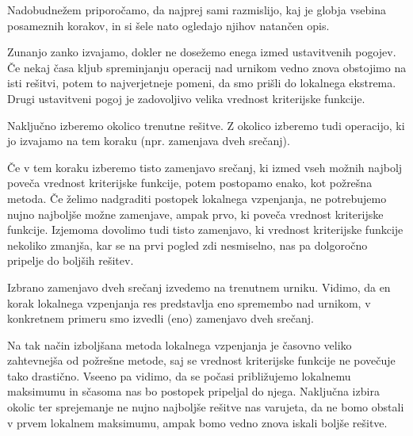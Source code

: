 \documentclass[a4paper,10pt]{article}
\begin{document}
   Nadobudnežem priporočamo, da najprej sami razmislijo, kaj je globja vsebina posameznih
   korakov, in si šele nato ogledajo njihov natančen opis.
   
      Zunanjo zanko izvajamo, dokler ne dosežemo enega izmed ustavitvenih pogojev.
      Če nekaj časa kljub spreminjanju operacij nad urnikom vedno znova obstojimo na isti
      rešitvi, potem to najverjetneje pomeni, da smo prišli do lokalnega ekstrema. Drugi
      ustavitveni pogoj je zadovoljivo velika vrednost kriterijske funkcije.
   
      Naključno izberemo okolico trenutne rešitve. Z okolico izberemo tudi operacijo,
      ki jo izvajamo na tem koraku (npr. zamenjava dveh srečanj).
   
      Če v tem koraku izberemo tisto zamenjavo srečanj, ki izmed vseh možnih najbolj
      poveča vrednost kriterijske funkcije, potem postopamo enako, kot požrešna metoda. Če
      želimo nadgraditi postopek lokalnega vzpenjanja, ne potrebujemo nujno najboljše možne
      zamenjave, ampak prvo, ki poveča vrednost kriterijske funkcije. Izjemoma dovolimo tudi
      tisto zamenjavo, ki vrednost kriterijske funkcije nekoliko zmanjša, kar se na prvi
      pogled zdi nesmiselno, nas pa dolgoročno pripelje do boljših rešitev.
   
      Izbrano zamenjavo dveh srečanj izvedemo na trenutnem urniku. Vidimo, da en korak
      lokalnega vzpenjanja res predstavlja eno spremembo nad urnikom, v konkretnem primeru
      smo izvedli (eno) zamenjavo dveh srečanj.
   
   Na tak način izboljšana metoda lokalnega vzpenjanja je časovno veliko zahtevnejša od
   požrešne metode, saj se vrednost kriterijske funkcije ne povečuje tako drastično. Vseeno
   pa vidimo, da se počasi približujemo lokalnemu maksimumu in sčasoma nas bo postopek
   pripeljal do njega. Naključna izbira okolic ter sprejemanje ne nujno najboljše rešitve
   nas varujeta, da ne bomo obstali v prvem lokalnem maksimumu, ampak bomo vedno znova
   iskali boljše rešitve.
   
\end{document}
